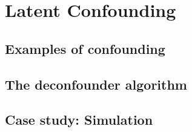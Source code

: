 \section{Latent Confounding}
\label{sec:latent-confounding}


\subsection{Examples of confounding}
\label{sec:confounding-examples}


\subsection{The deconfounder algorithm}
\label{sec:deconfounder-algo}


\subsection{Case study: Simulation}
\label{sec:deconfounder-simulation}
